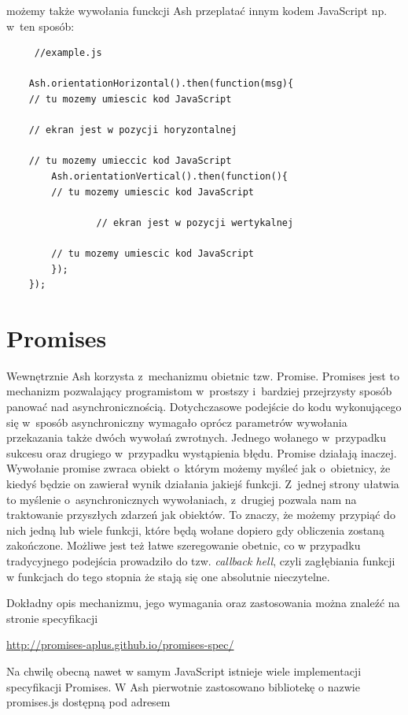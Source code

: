 \documentclass[brudnopis]{xmgr}
\begin{document}
możemy także wywołania funckcji Ash przeplatać innym kodem JavaScript np. w~ten sposób:

\begin{lstlisting}
     //example.js

    Ash.orientationHorizontal().then(function(msg){
	// tu mozemy umiescic kod JavaScript
      	
	// ekran jest w pozycji horyzontalnej
      
	// tu mozemy umieccic kod JavaScript
      	Ash.orientationVertical().then(function(){
		// tu mozemy umiescic kod JavaScript

        		// ekran jest w pozycji wertykalnej 

		// tu mozemy umiescic kod JavaScript
      	});
    });
\end{lstlisting}

\section{Promises}

Wewnętrznie Ash korzysta z~mechanizmu obietnic tzw. Promise. Promises jest to mechanizm pozwalający programistom w~prostszy i~bardziej przejrzysty sposób panować nad asynchronicznością. Dotychczasowe podejście do kodu wykonującego się w~sposób asynchroniczny wymagało oprócz parametrów wywołania przekazania także dwóch wywołań zwrotnych. Jednego wołanego w~przypadku sukcesu oraz drugiego w~przypadku wystąpienia błędu. Promise działają inaczej. Wywołanie promise zwraca obiekt o~którym możemy myśleć jak o~obietnicy, że kiedyś będzie on zawierał wynik działania jakiejś funkcji. Z~jednej strony ułatwia to myślenie o~asynchronicznych wywołaniach, z~drugiej pozwala nam na traktowanie przyszłych zdarzeń jak obiektów. To znaczy, że możemy przypiąć do nich jedną lub wiele funkcji, które będą wołane dopiero gdy obliczenia zostaną zakończone. Możliwe jest też łatwe szeregowanie obetnic, co w przypadku tradycyjnego podejścia prowadziło do tzw. \textit{callback hell}, czyli zagłębiania funkcji w funkcjach do tego stopnia że stają się one absolutnie nieczytelne. 

Dokładny opis mechanizmu, jego wymagania oraz zastosowania można znaleźć na  stronie specyfikacji

\url{http://promises-aplus.github.io/promises-spec/}

Na chwilę obecną nawet w samym JavaScript istnieje wiele implementacji specyfikacji Promises. W Ash pierwotnie zastosowano bibliotekę o nazwie promises.js dostępną pod adresem
\end{document}
